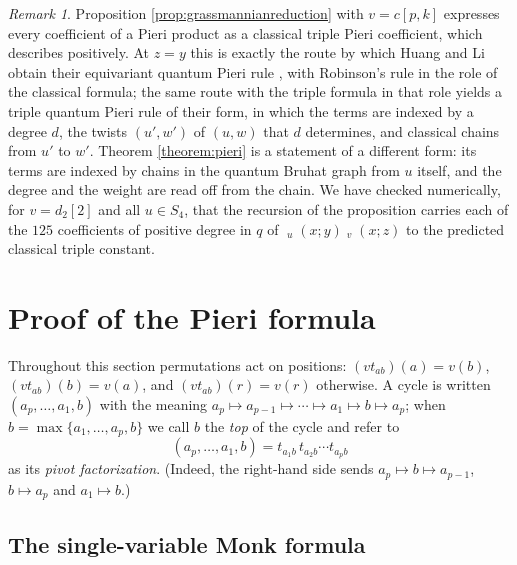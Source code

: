 \documentclass{amsart}
\theoremstyle{definition}
\theoremstyle{remark}
\newtheorem{remark}[lemma]{Remark}
\numberwithin{equation}{section}
\DeclareMathOperator{\qsch}{\widetilde{\mathfrak{S}}}
\newcommand{\xrightsquigarrow}[2][]{%
	\mathrel{\mathop{\rightsquigarrow}\limits^{\scriptstyle #2}%
	\ifx\hfuzz#1\hfuzz\else_{\scriptstyle #1}\fi}%
}
\newcommand{\tom}[1]{\ensuremath{\xrightsquigarrow{#1}}}
\begin{document}
\begin{remark}
Proposition \ref{prop:grassmannianreduction} with $v=c[p,k]$ expresses every coefficient of a Pieri product as a classical triple Pieri coefficient, which \cite[Theorem~7.1]{samuelmolev} describes positively. At $z=y$ this is exactly the route by which Huang and Li obtain their equivariant quantum Pieri rule \cite[Theorem~3.10]{huang2015equivariant}, with Robinson's rule \cite{robinsonpieri} in the role of the classical formula; the same route with the triple formula in that role yields a triple quantum Pieri rule of their form, in which the terms are indexed by a degree $d$, the twists $(u',w')$ of $(u,w)$ that $d$ determines, and classical chains from $u'$ to $w'$. Theorem \ref{theorem:pieri} is a statement of a different form: its terms are indexed by chains in the quantum Bruhat graph from $u$ itself, and the degree and the weight are read off from the chain. We have checked numerically, for $v=d_2[2]$ and all $u\in S_4$, that the recursion of the proposition carries each of the $125$ coefficients of positive degree in $q$ of $\qsch_u(x;y)\qsch_v(x;z)$ to the predicted classical triple constant.
\end{remark}

\section{Proof of the Pieri formula} \label{section:proofpieri}

\newcommand{\ntom}[1]{\centernot{\tom{#1}}}
\newcommand{\desc}{\mathrm{desc}}
\newcommand{\lup}{\triangleleft}
\newcommand{\supp}{\mathrm{supp}}
\newcommand{\Lw}{L}
\newcommand{\qw}{\mathbf{q}}

Throughout this section permutations act on positions: $(vt_{ab})(a)=v(b)$, $(vt_{ab})(b)=v(a)$, and $(vt_{ab})(r)=v(r)$ otherwise. A cycle is written $(a_p,\ldots,a_1,b)$ with the meaning $a_p\mapsto a_{p-1}\mapsto\cdots\mapsto a_1\mapsto b\mapsto a_p$; when $b=\max\{a_1,\ldots,a_p,b\}$ we call $b$ the \emph{top} of the cycle and refer to
\begin{equation}\label{eq:pivot}
(a_p,\ldots,a_1,b)=t_{a_1b}\,t_{a_2b}\cdots t_{a_pb}
\end{equation}
as its \emph{pivot factorization}. (Indeed, the right-hand side sends $a_p\mapsto b\mapsto a_{p-1}$, $b\mapsto a_p$ and $a_1\mapsto b$.)

\subsection{The single-variable Monk formula}
\end{document}
